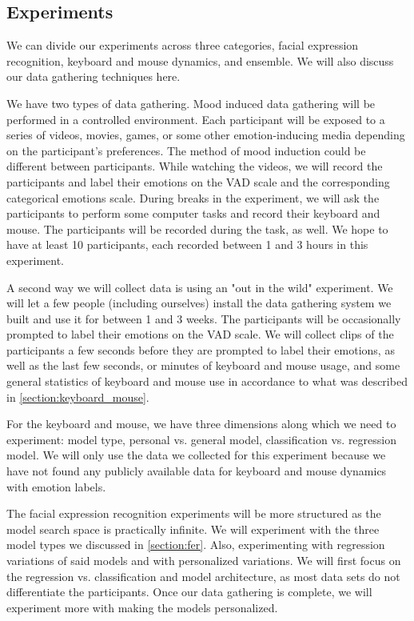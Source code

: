 \documentclass[../main.tex]{subfiles}
\begin{document}
\subsection{Experiments}
We can divide our experiments across three categories, facial expression recognition,
keyboard and mouse dynamics, and ensemble. We will also discuss our data gathering techniques here.
\par

We have two types of data gathering. Mood induced data gathering will be performed in a controlled environment. Each participant
will be exposed to a series of videos, movies, games, or some other emotion-inducing media depending on the participant's preferences.
The method of mood induction could be different between participants.
While watching the videos, we will record the participants and label their emotions on the VAD scale and the corresponding
categorical emotions scale. During breaks in the experiment, we will ask the participants to perform some computer tasks and record
their keyboard and mouse. The participants will be recorded during the task, as well. We hope to have at least 10 participants, each recorded
between 1 and 3 hours in this experiment.

A second way we will collect data is using an "out in the wild" experiment. We will let a few people (including ourselves)
install the data gathering system we built and use it for between 1 and 3 weeks. The participants will be occasionally prompted
to label their emotions on the VAD scale. We will collect clips of the participants a few seconds before they are prompted to
label their emotions, as well as the last few seconds, or minutes of keyboard and mouse usage,
and some general statistics of keyboard and mouse use in accordance to what was described in \ref{section:keyboard_mouse}.
\par

For the keyboard and mouse, we have three dimensions along which we need to experiment: model type, personal vs. general model,
classification vs. regression model. We will only use the data we collected for this experiment because we have not found any publicly
available data for keyboard and mouse dynamics with emotion labels. 
\par

The facial expression recognition experiments will be more structured as the model search space is practically infinite.
We will experiment with the three model types we discussed in \ref{section:fer}. Also, experimenting with regression variations of said
models and with personalized variations. We will first focus on the regression vs. classification and model architecture, as most data sets
do not differentiate the participants. Once our data gathering is complete, we will experiment more with making the models personalized.
\par
\end{document}

